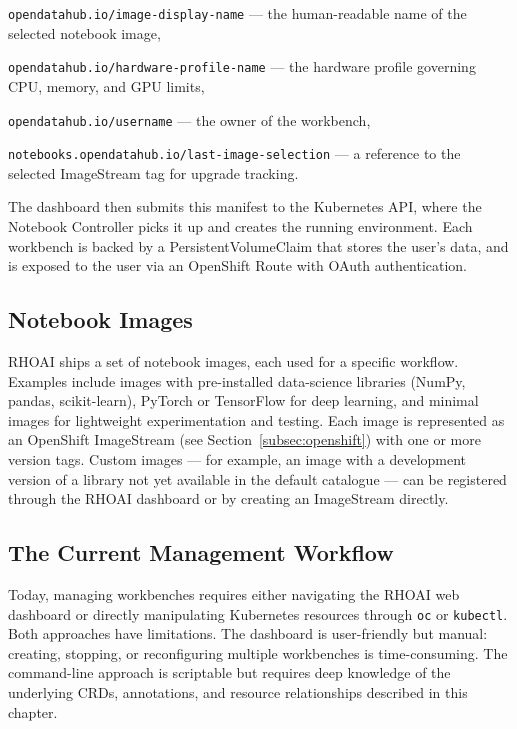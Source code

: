 \documentclass[
  digital,     %
  oneside,     %
  nosansbold,  %
  nocolorbold, %
  lof,         %
  lot,         %
]{fithesis4}
\begin{document}
\begin{compactitem}
  \item \texttt{opendatahub.io/\allowbreak image-display-name} --- the human-readable name
        of the selected notebook image,
  \item \texttt{opendatahub.io/\allowbreak hardware-profile-name} --- the hardware profile
        governing CPU, memory, and GPU limits,
  \item \texttt{opendatahub.io/\allowbreak username} --- the owner of the workbench,
  \item \texttt{notebooks.opendatahub.io/\allowbreak last-image-selection} --- a reference
        to the selected ImageStream tag for upgrade tracking.
\end{compactitem}

The dashboard then submits this manifest to the Kubernetes API, where the
Notebook Controller picks it up and creates the running environment. Each
workbench is backed by a PersistentVolumeClaim that stores the user's data, 
and is exposed to the user via an OpenShift Route with OAuth
authentication.

\subsection{Notebook Images}
\label{subsec:notebook-images}

RHOAI ships a set of notebook images, each used for a specific
workflow. Examples include images with pre-installed data-science libraries
(NumPy, pandas, scikit-learn), PyTorch or TensorFlow for deep learning, and
minimal images for lightweight experimentation and testing. Each image is 
represented as an OpenShift ImageStream (see Section~\ref{subsec:openshift}) 
with one or more version tags. 
Custom images --- for example, an image with a development version of a library
not yet available in the default catalogue --- can be registered through the
RHOAI dashboard or by creating an ImageStream directly.

\subsection{The Current Management Workflow}
\label{subsec:current-workflow}

Today, managing workbenches requires either navigating the RHOAI web dashboard
or directly manipulating Kubernetes resources through \texttt{oc} or
\texttt{kubectl}. Both approaches have limitations. The dashboard is
user-friendly but manual: creating, stopping, or reconfiguring multiple
workbenches is time-consuming. The
command-line approach is scriptable but requires deep knowledge of the
underlying CRDs, annotations, and resource relationships described in this
chapter.
\end{document}
